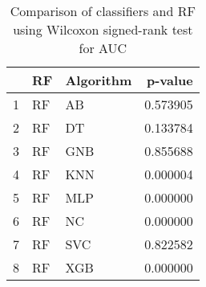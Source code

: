 \begin{table}
\footnotesize
\caption{Comparison of classifiers and RF using Wilcoxon signed-rank test for AUC}
\label{tab:RF wilcoxon AUC comparison}
\begin{tabular}{lllr}
\hline
 & RF & Algorithm & p-value \\
\hline
1 & RF & AB & 0.573905 \\
2 & RF & DT & 0.133784 \\
3 & RF & GNB & 0.855688 \\
4 & RF & KNN & 0.000004 \\
5 & RF & MLP & 0.000000 \\
6 & RF & NC & 0.000000 \\
7 & RF & SVC & 0.822582 \\
8 & RF & XGB & 0.000000 \\
\hline
\end{tabular}
\end{table}
